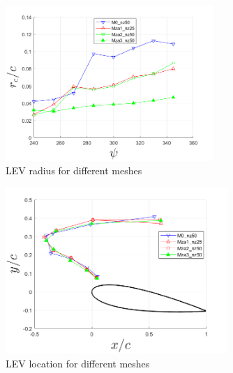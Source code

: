 \begin{figure}[H]
	\centering
	\includegraphics[width=0.7\textwidth]{figures/zonal_adapt_results/LEV_Re200k/LEV_radius_vp}
	\caption{ LEV radius for different meshes}
	\label{fig:zonal_LEV_radius_Re200k}
\end{figure}


\begin{figure}[H]
	\centering
	\includegraphics[width=0.75\textwidth]{figures/zonal_adapt_results/LEV_Re200k/LEV_location_Re200k}
	\caption{ LEV location for different meshes}
	\label{fig:zonal_LEV_location_Re200k}
\end{figure}


